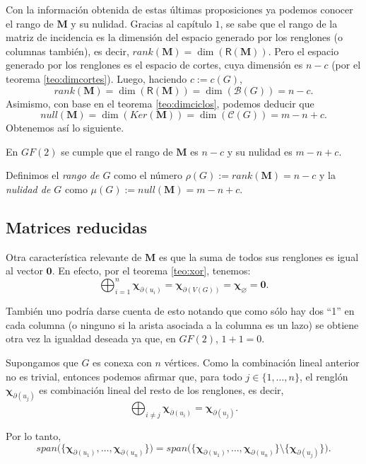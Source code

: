 Con la información obtenida de estas últimas proposiciones ya podemos conocer el rango de $\mathbf{M}$ y su nulidad. Gracias al capítulo $1$, se sabe que el rango de la matriz de incidencia es la dimensión del espacio generado por los renglones (o columnas también), es decir, $rank(\mathbf{M}) = \dim(\mathsf{R}(\mathbf{M}))$. Pero el espacio generado por los renglones es el espacio de cortes, cuya dimensión es $n-c$ (por el teorema \ref{teo:dimcortes}). Luego, haciendo $c:=c(G)$, $$rank(\mathbf{M}) = \dim(\mathsf{R}(\mathbf{M})) = \dim(\mathcal{B}(G)) = n - c.$$  Asimismo, con base en el teorema \ref{teo:dimciclos}, podemos deducir que $$null(\mathbf{M})=\dim(Ker(\mathbf{M}))= \dim(\mathcal{C}(G)) = m - n + c.$$ Obtenemos así lo siguiente.

\begin{teo} 
En $GF(2)$
se cumple que el rango de $\mathbf{M}$ es $n-c$ y su nulidad es $m -n +c$.
\end{teo}

  Definimos el \textit{rango de $G$} como el número $\rho(G) :=  rank(\mathbf{M}) = n -c$ y la \textit{nulidad de $G$} como $\mu(G):= null(\mathbf{M}) = m - n + c$.

\subsection{Matrices reducidas}

Otra característica relevante de $\mathbf{M}$ es que la suma de todos sus renglones es igual al vector $\mathbf{0}$. En efecto, por el teorema \ref{teo:xor}, tenemos:
$$
\bigoplus_{i=1}^{n} \boldsymbol{\chi}_{\partial(u_{i})} = \boldsymbol{\chi}_{\partial(V(G))} = \boldsymbol{\chi}_{\varnothing} = \mathbf{0}.
$$

También uno podría darse cuenta de esto notando que como sólo hay dos ``1'' en cada columna (o ninguno si la arista asociada  a la columna es un lazo) se obtiene otra vez la igualdad deseada ya que, en $GF(2)$, $1+1=0$.

Supongamos que $G$ es conexa con $n$ vértices. Como la combinación lineal anterior no es trivial, entonces podemos afirmar que, para todo $j \in \{1, \ldots, n\}$, el renglón $\boldsymbol{\chi}_{\partial(u_{j})}$ es combinación lineal del resto de los renglones, es decir, $$\bigoplus_{i\neq j} \boldsymbol{\chi}_{\partial(u_{i})} = \boldsymbol{\chi}_{\partial(u_{j})}.$$

Por lo tanto, 
$$
 span\Big(\{\boldsymbol{\chi}_{\partial(u_{1})}, \ldots, \boldsymbol{\chi}_{\partial(u_{n})} \}\Big) =
span\Big (\{ \boldsymbol{\chi}_{\partial(u_{1})}, \ldots, \boldsymbol{\chi}_{\partial(u_{n})} \} \setminus \{\boldsymbol{\chi}_{\partial(u_{j})} \}\Big ).
$$


